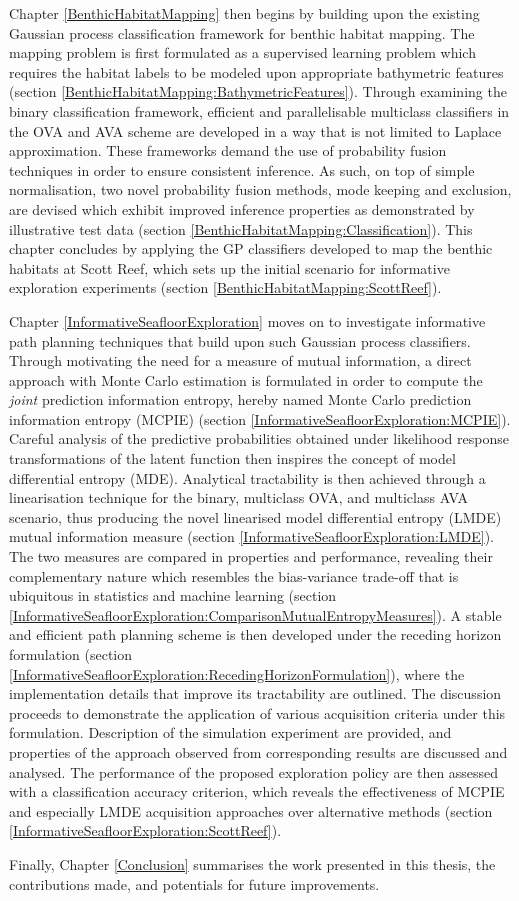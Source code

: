 		Chapter \ref{BenthicHabitatMapping} then begins by building upon the existing Gaussian process classification framework for benthic habitat mapping. The mapping problem is first formulated as a supervised learning problem which requires the habitat labels to be modeled upon appropriate bathymetric features (section \ref{BenthicHabitatMapping:BathymetricFeatures}). Through examining the binary classification framework, efficient and parallelisable multiclass classifiers in the OVA and AVA scheme are developed in a way that is not limited to Laplace approximation. These frameworks demand the use of probability fusion techniques in order to ensure consistent inference. As such, on top of simple normalisation, two novel probability fusion methods, mode keeping and exclusion, are devised which exhibit improved inference properties as demonstrated by illustrative test data (section \ref{BenthicHabitatMapping:Classification}). This chapter concludes by applying the GP classifiers developed to map the benthic habitats at Scott Reef, which sets up the initial scenario for informative exploration experiments (section \ref{BenthicHabitatMapping:ScottReef}).
		
		Chapter \ref{InformativeSeafloorExploration} moves on to investigate informative path planning techniques that build upon such Gaussian process classifiers. Through motivating the need for a measure of mutual information, a direct approach with Monte Carlo estimation is formulated in order to compute the \textit{joint} prediction information entropy, hereby named Monte Carlo prediction information entropy (MCPIE) (section \ref{InformativeSeafloorExploration:MCPIE}). Careful analysis of the predictive probabilities obtained under likelihood response transformations of the latent function then inspires the concept of model differential entropy (MDE). Analytical tractability is then achieved through a linearisation technique for the binary, multiclass OVA, and multiclass AVA scenario, thus producing the novel linearised model differential entropy (LMDE) mutual information measure (section \ref{InformativeSeafloorExploration:LMDE}). The two measures are compared in properties and performance, revealing their complementary nature which resembles the bias-variance trade-off that is ubiquitous in statistics and machine learning (section \ref{InformativeSeafloorExploration:ComparisonMutualEntropyMeasures}). A stable and efficient path planning scheme is then developed under the receding horizon formulation (section \ref{InformativeSeafloorExploration:RecedingHorizonFormulation}), where the implementation details that improve its tractability are outlined. The discussion proceeds to demonstrate the application of various acquisition criteria under this formulation. Description of the simulation experiment are provided, and properties of the approach observed from corresponding results are discussed and analysed. The performance of the proposed exploration policy are then assessed with a classification accuracy criterion, which reveals the effectiveness of MCPIE and especially LMDE acquisition approaches over alternative methods (section \ref{InformativeSeafloorExploration:ScottReef}).
				
		Finally, Chapter \ref{Conclusion} summarises the work presented in this thesis, the contributions made, and potentials for future improvements.